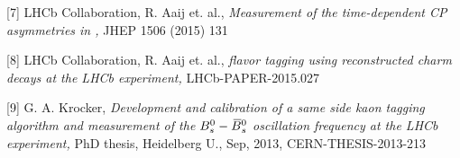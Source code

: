 {\begin{minipage}{0.474\boxwidth}
\begin{compactitem}
\end{compactitem}
\begin{compactitem}
{\tiny\item[{[7]}] LHCb Collaboration, R. Aaij et. al., {\it Measurement of the time-dependent CP asymmetries in \BsToJPsiKS, } JHEP 1506 (2015) 131}
\end{compactitem}
\begin{compactitem}
{\tiny\item[{[8]}] LHCb Collaboration, R. Aaij et. al., {\it \B flavor tagging using reconstructed charm decays at the LHCb experiment, } LHCb-PAPER-2015.027}
\end{compactitem}
\begin{compactitem}
{\tiny\item[{[9]}] G. A. Krocker, {\it Development and calibration of a same side kaon tagging algorithm and measurement of the $B^0_s-\kern 0.18em\overline{\kern -0.18em B}{}^0_s$ oscillation frequency \dms at the LHCb experiment, } PhD thesis, Heidelberg U., Sep, 2013, CERN-THESIS-2013-213}
\end{compactitem}
\vspace{0.28em}
\end{minipage}

}
